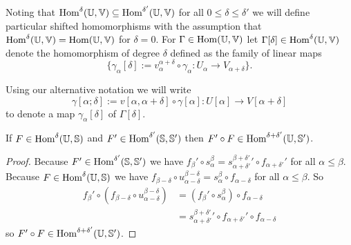 Noting that $\mathrm{Hom}^\delta(\mathbb{U},\mathbb{V})\subseteq\mathrm{Hom}^{\delta'}(\mathbb{U},\mathbb{V})$ for all $0\leq\delta\leq\delta'$ we will define particular shifted homomorphisms with the assumption that $\mathrm{Hom}^\delta(\mathbb{U},\mathbb{V}) = \mathrm{Hom}(\mathbb{U},\mathbb{V})$ for $\delta = 0$.
For $\Gamma\in\mathrm{Hom}(\mathbb{U},\mathbb{V})$ let $\Gamma[\delta]\in\mathrm{Hom}^\delta(\mathbb{U},\mathbb{V})$ denote the homomorphism of degree $\delta$ defined as the family of linear maps
\[\{\gamma_\alpha[\delta] := v_\alpha^{\alpha+\delta}\circ \gamma_\alpha : U_\alpha\to V_{\alpha+\delta}\}.\]

Using our alternative notation we will write
\[\gamma[\alpha;\delta] := v[\alpha,\alpha+\delta]\circ\gamma[\alpha] : U[\alpha]\to V[\alpha+\delta]\]
to denote a map $\gamma_\alpha[\delta]$ of $\Gamma[\delta]$.

\begin{lemma}\label{lem:trans_shift}
  If $F\in \mathrm{Hom}^\delta(\mathbb{U},\mathbb{S})$ and $F'\in\mathrm{Hom}^{\delta'}(\mathbb{S},\mathbb{S}')$ then $F'\circ F\in\mathrm{Hom}^{\delta+\delta'}(\mathbb{U},\mathbb{S}')$.
\end{lemma}
\begin{proof}
  Because $F'\in \mathrm{Hom}^{\delta'}(\mathbb{S},\mathbb{S}')$ we have $f_{\beta}'\circ s_\alpha^\beta = {s_{\alpha+\delta'}^{\beta+\delta'}}'\circ f_{\alpha+\delta'}'$ for all $\alpha\leq\beta$.
  Because $F\in\mathrm{Hom}^\delta(\mathbb{U},\mathbb{S})$ we have $f_{\beta-\delta}\circ u_{\alpha-\delta}^{\beta-\delta} = s_\alpha^\beta\circ f_{\alpha-\delta}$ for all $\alpha\leq\beta$.
  So
  \begin{align*}
    f_{\beta}'\circ (f_{\beta-\delta}\circ u_{\alpha-\delta}^{\beta-\delta})
      &= (f_{\beta}'\circ s_\alpha^\beta)\circ f_{\alpha-\delta}\\
      &= {s_{\alpha+\delta'}^{\beta+\delta'}}'\circ f_{\alpha+\delta'}'\circ f_{\alpha-\delta}
  \end{align*}
  so $F'\circ F\in\mathrm{Hom}^{\delta+\delta'}(\mathbb{U},\mathbb{S}')$.
\end{proof}

